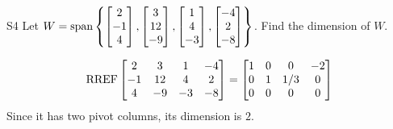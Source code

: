 \begin{problem}{S4}
Let \(
  W=\operatorname{span}\left\{
    \begin{bmatrix} 2 \\ -1 \\ 4 \end{bmatrix},
    \begin{bmatrix} 3 \\ 12 \\ -9 \end{bmatrix},
    \begin{bmatrix} 1 \\ 4 \\ -3 \end{bmatrix},
    \begin{bmatrix} -4 \\ 2 \\ -8 \end{bmatrix}
  \right\}
\). Find the dimension of \(W\).
\end{problem}
\begin{solution}
\[
  \operatorname{RREF}\begin{bmatrix}
    2 & 3 & 1 & -4 \\
    -1 & 12 & 4 & 2 \\
    4 & -9 & -3 & -8
  \end{bmatrix} =
  \begin{bmatrix}
    1 & 0 & 0 & -2 \\
    0 & 1 & 1/3 & 0 \\
    0 & 0 & 0 & 0
  \end{bmatrix}
\]
Since it has two pivot columns, its dimension is \(2\).
\end{solution}

